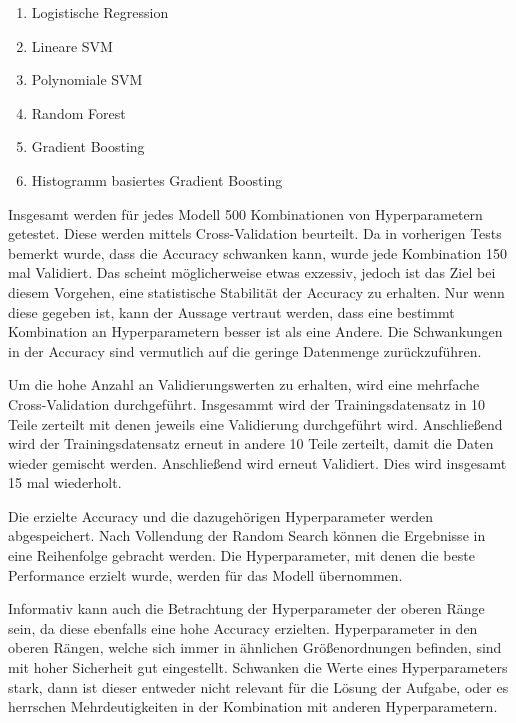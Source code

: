\begin{enumerate}
    \item Logistische Regression
    \item Lineare SVM
    \item Polynomiale SVM
    \item Random Forest
    \item Gradient Boosting
    \item Histogramm basiertes Gradient Boosting
\end{enumerate}

Insgesamt werden für jedes Modell 500 Kombinationen von Hyperparametern getestet. Diese werden mittels Cross-Validation beurteilt. Da in vorherigen Tests bemerkt wurde, dass die Accuracy schwanken kann, wurde jede Kombination 150 mal Validiert. Das scheint möglicherweise etwas exzessiv, jedoch ist das Ziel bei diesem Vorgehen, eine statistische Stabilität der Accuracy zu erhalten. Nur wenn diese gegeben ist, kann der Aussage vertraut werden, dass eine bestimmt Kombination an Hyperparametern besser ist als eine Andere. Die Schwankungen in der Accuracy sind vermutlich auf die geringe Datenmenge zurückzuführen. \par

Um die hohe Anzahl an Validierungswerten zu erhalten, wird eine mehrfache Cross-Validation durchgeführt. Insgesammt wird der Trainingsdatensatz in 10 Teile zerteilt mit denen jeweils eine Validierung durchgeführt wird. Anschließend wird der Trainingsdatensatz erneut in andere 10 Teile zerteilt, damit die Daten wieder gemischt werden. Anschließend wird erneut Validiert. Dies wird insgesamt 15 mal wiederholt. \par

Die erzielte Accuracy und die dazugehörigen Hyperparameter werden abgespeichert. Nach Vollendung der Random Search können die Ergebnisse in eine Reihenfolge gebracht werden. Die Hyperparameter, mit denen die beste Performance erzielt wurde, werden für das Modell übernommen. \par

Informativ kann auch die Betrachtung der Hyperparameter der oberen Ränge sein, da diese ebenfalls eine hohe Accuracy erzielten. Hyperparameter in den oberen Rängen, welche sich immer in ähnlichen Größenordnungen befinden, sind mit hoher Sicherheit gut eingestellt. Schwanken die Werte eines Hyperparameters stark, dann ist dieser entweder nicht relevant für die Lösung der Aufgabe, oder es herrschen Mehrdeutigkeiten in der Kombination mit anderen Hyperparametern. \par

